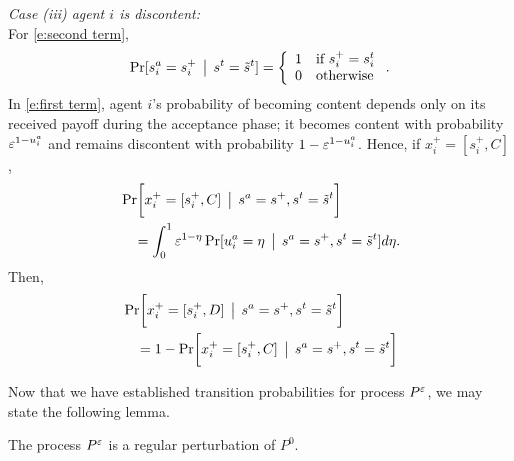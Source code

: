 \noindent\emph{Case (iii) agent $i$ is discontent:} \\
\noindent For \eqref{e:second term}, %
\begin{align*}
\Pr[ s_i^a = s_i^+\given s^t = \tilde{s}^t]%
= \left\{
\begin{array}{ll}
1 &\text{if } s_i^+ = s_i^t\\
0 &\text{otherwise}
\end{array}
\right. .
\end{align*}
In \eqref{e:first term}, agent $i$'s probability of becoming content depends only on its received payoff during the acceptance phase; it becomes content with probability $\varepsilon^{1 - u_i^a}$ and remains discontent with probability $1 - \varepsilon^{1 - u_i^a}$. Hence, if $x_i^+ = [s_i^+,C]$,
\begin{align*}
&\operatorname{ Pr }\biggl[x_i^+ = [s_i^+,C] \,\bigm\vert\, s^a = s^+, s^t = \tilde{s}^t\biggr]\\
&\quad= \int_0^1 \varepsilon^{1 - \eta}\operatorname{ Pr }[u_i^a = \eta \,\bigm\vert\, s^a = s^+, s^t = \tilde{s}^t]d\eta.
\end{align*}
Then, 
\begin{align*}
&\operatorname{ Pr }\biggl[x_i^+ = [s_i^+,D] \,\bigm\vert\, s^a = s^+, s^t = \tilde{s}^t\biggr] \\
&\quad= 1 - \operatorname{ Pr }\biggl[x_i^+ = [s_i^+,C] \,\bigm\vert\, s^a = s^+, s^t = \tilde{s}^t\biggr]
\end{align*}



Now that we have established transition probabilities for process $P^\varepsilon$, we may state the following lemma.
\begin{lemma} \label{l:RPP}The process $P^\varepsilon$ is a regular perturbation of $P^0.$ 
\end{lemma}

